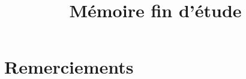 \documentclass[french, a4paper, 12pt]{report}
\title{Mémoire fin d'étude }
\begin{document}





%



\tableofcontents
\listoffigures
\chapter*{Remerciements}
\end{document}
